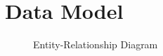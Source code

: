 \section{Data Model}

\begin{figure}[H]
  \centering
  \caption{Entity-Relationship Diagram}
\end{figure}
